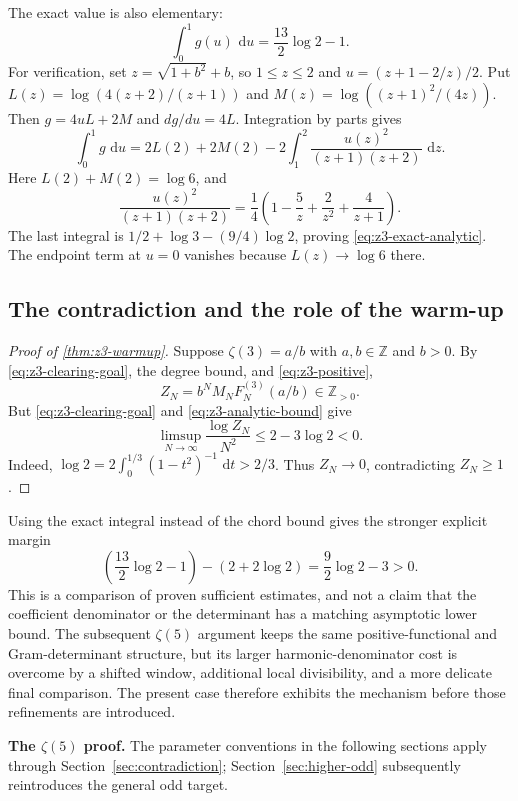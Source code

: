 \documentclass[11pt,letterpaper]{article}
\theoremstyle{definition}
\newcommand{\Z}{\mathbb Z}
\newcommand{\dd}{\,\mathrm d}
\begin{document}
The exact value is also elementary:
\begin{equation}\label{eq:z3-exact-analytic}
 \int_0^1g(u)\,\dd u=\frac{13}{2}\log2-1.
\end{equation}
For verification, set $z=\sqrt{1+b^2}+b$, so $1\le z\le2$ and
$u=(z+1-2/z)/2$. Put
$L(z)=\log(4(z+2)/(z+1))$ and
$M(z)=\log((z+1)^2/(4z))$. Then $g=4uL+2M$ and $dg/du=4L$.
Integration by parts gives
\[
 \int_0^1g\,\dd u
 =2L(2)+2M(2)
 -2\int_1^2\frac{u(z)^2}{(z+1)(z+2)}\,\dd z.
\]
Here $L(2)+M(2)=\log6$, and
\[
 \frac{u(z)^2}{(z+1)(z+2)}
 =\frac14\left(1-\frac5z+\frac2{z^2}+\frac4{z+1}\right).
\]
The last integral is $1/2+\log3-(9/4)\log2$, proving
\eqref{eq:z3-exact-analytic}. The endpoint term at $u=0$ vanishes
because $L(z)\to\log6$ there.

\subsection{The contradiction and the role of the warm-up}

\begin{proof}[Proof of \cref{thm:z3-warmup}]
Suppose $\zeta(3)=a/b$ with $a,b\in\Z$ and $b>0$.
By \eqref{eq:z3-clearing-goal}, the degree bound, and
\eqref{eq:z3-positive},
\[
 Z_N=b^NM_NF_N^{(3)}(a/b)\in\Z_{>0}.
\]
But \eqref{eq:z3-clearing-goal} and \eqref{eq:z3-analytic-bound} give
\[
 \limsup_{N\to\infty}\frac{\log Z_N}{N^2}
 \le2-3\log2<0.
\]
Indeed,
$\log2=2\int_0^{1/3}(1-t^2)^{-1}\,\dd t>2/3$.
Thus $Z_N\to0$, contradicting $Z_N\ge1$.
\end{proof}

Using the exact integral instead of the chord bound gives the stronger
explicit margin
\[
 \left(\frac{13}{2}\log2-1\right)-(2+2\log2)
 =\frac92\log2-3>0.
\]
This is a comparison of proven sufficient estimates, and not a claim that
the coefficient denominator or the determinant has a matching
asymptotic lower bound. The subsequent $\zeta(5)$ argument keeps the
same positive-functional and Gram-determinant structure, but its larger
harmonic-denominator cost is overcome by a shifted window,
additional local divisibility, and a more delicate final comparison. The present
case therefore exhibits the mechanism before those refinements are
introduced.


\medskip\noindent\textbf{The $\zeta(5)$ proof.} The parameter conventions in the following sections apply through Section~\ref{sec:contradiction}; Section~\ref{sec:higher-odd} subsequently reintroduces the general odd target.
\end{document}
